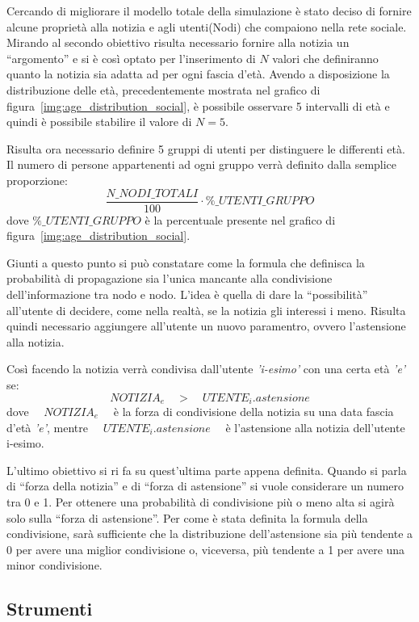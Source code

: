 Cercando di migliorare il modello totale della simulazione è stato deciso di fornire alcune proprietà alla notizia e 
agli utenti(Nodi) che compaiono nella rete sociale.
Mirando al secondo obiettivo risulta necessario fornire alla notizia un ``argomento'' e si 
è così optato per l'inserimento di $N$ valori che definiranno quanto la notizia sia adatta ad per ogni fascia d'età.
Avendo a disposizione la distribuzione delle età, precedentemente mostrata nel grafico di figura~\ref{img:age_distribution_social},
è possibile osservare 5 intervalli di età e quindi è possibile stabilire il valore di $N = 5$.

Risulta ora necessario definire 5 gruppi di utenti per distinguere le differenti età.
Il numero di persone appartenenti ad ogni gruppo verrà definito dalla semplice proporzione:
\[
\frac{N\_NODI\_TOTALI}{100} \cdot \%\_UTENTI\_GRUPPO
\]
dove $\%\_UTENTI\_GRUPPO$ è la percentuale presente nel grafico di figura~\ref{img:age_distribution_social}.

Giunti a questo punto si può constatare come la formula che definisca la probabilità di propagazione 
sia l'unica mancante alla condivisione dell'informazione tra nodo e nodo.
L'idea è quella di dare la ``possibilità'' all'utente di decidere, come nella realtà, se la 
notizia gli interessi i meno. 
Risulta quindi necessario aggiungere all'utente un nuovo paramentro, ovvero l'astensione alla notizia.

Così facendo la notizia verrà condivisa dall'utente \emph{'i-esimo'} con una certa età \emph{'e'} se:
\[
NOTIZIA_e \quad > \quad UTENTE_i.astensione
\]
dove $\quad NOTIZIA_e \quad$ è la forza di condivisione della notizia su una data fascia d'età \emph{'e'}, 
mentre $\quad UTENTE_i.astensione \quad$ è l'astensione alla notizia dell'utente i-esimo.

L'ultimo obiettivo si ri fa su quest'ultima parte appena definita.
Quando si parla di ``forza della notizia'' e di ``forza di astensione'' si vuole considerare un numero tra 0 e 1.
Per ottenere una probabilità di condivisione più o meno alta si agirà solo sulla ``forza di astensione''.
Per come è stata definita la formula della condivisione, sarà sufficiente che la distribuzione dell'astensione sia più 
tendente a 0 per avere una miglior condivisione o, viceversa, più tendente a 1 per avere una minor condivisione.

\subsection{Strumenti}



